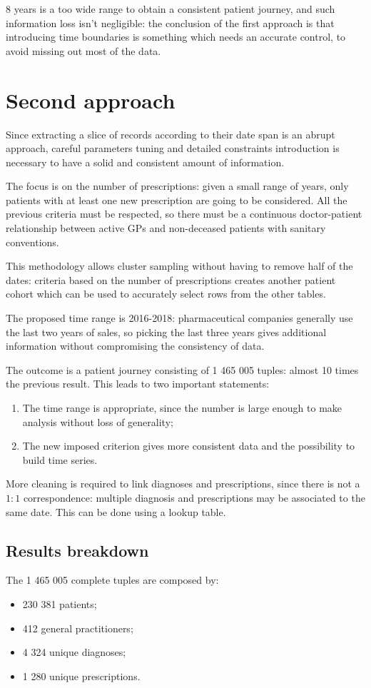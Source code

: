 8 years is a too wide range to obtain a consistent patient journey, and such information loss isn't negligible: the conclusion of the first approach is that introducing time boundaries is something which needs an accurate control, to avoid missing out most of the data.

\section{Second approach}
Since extracting a slice of records according to their date span is an abrupt approach, careful parameters tuning and detailed constraints introduction is necessary to have a solid and consistent amount of information.

The focus is on the number of prescriptions: given a small range of years, only patients with at least one new prescription are going to be considered. All the previous criteria must be respected, so there must be a continuous doctor-patient relationship between active GPs and non-deceased patients with sanitary conventions.

This methodology allows cluster sampling without having to remove half of the dates: criteria based on the number of prescriptions creates another patient cohort which can be used to accurately select rows from the other tables.

The proposed time range is 2016-2018: pharmaceutical companies generally use the last two years of sales, so picking the last three years gives additional information without compromising the consistency of data.

The outcome is a patient journey consisting of 1 465 005 tuples: almost 10 times the previous result. This leads to two important statements:
\begin{enumerate}
	\item The time range is appropriate, since the number is large enough to make analysis without loss of generality;
	\item The new imposed criterion gives more consistent data and the possibility to build time series.
\end{enumerate}

More cleaning is required to link diagnoses and prescriptions, since there is not a $1 : 1$ correspondence: multiple diagnosis and prescriptions may be associated to the same date. This can be done using a lookup table.

\subsection{Results breakdown}
The 1 465 005 complete tuples are composed by:
\begin{itemize}
	\item 230 381 patients;
	\item 412 general practitioners;
	\item 4 324 unique diagnoses;
	\item 1 280 unique prescriptions.
\end{itemize}

